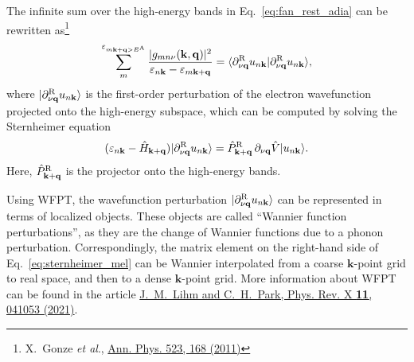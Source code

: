 \documentclass[a4paper,11pt,serif]{article}
\newcommand{\Eq}[1]{{Eq.~\eqref{#1}}}
\newcommand{\mb}[1]{\mathbf{#1}}
\begin{document}
The infinite sum over the high-energy bands in Eq.~\eqref{eq:fan_rest_adia} can be rewritten as\footnote{X.\ Gonze \textit{et al}., \href{https://onlinelibrary.wiley.com/doi/10.1002/andp.201000100}{Ann. Phys. 523, 168 (2011)}}
\begin{equation} \label{eq:sternheimer_mel}
   \sum_{m}^{\varepsilon_{m\mb{k}+\mb{q} > E^{\rm A}}} \frac{| g_{mn\nu}(\mb{k,q})|^2}{\varepsilon_{n\mb{k}} - \varepsilon_{m\mb{k}+\mb{q}}}
   = \langle \partial^{\rm R}_{\nu\mb{q}} u_{n\mb{k}} | \partial^{\rm R}_{\nu\mb{q}} u_{n\mb{k}} \rangle,
\end{equation}
where $| \partial^{\rm R}_{\nu\mb{q}} u_{n\mb{k}} \rangle$ is the first-order perturbation of the electron wavefunction projected onto the high-energy subspace, which can be computed by solving the Sternheimer equation
\begin{equation} \label{eq:sternheimer}
   (\varepsilon_{n\mb{k}} - \hat{H}_{\mb{k}+\mb{q}}) | \partial^{\rm R}_{\nu\mb{q}} u_{n\mb{k}} \rangle
   =  \hat{P}^{\rm R}_{\mb{k+q}} \,  \partial_{\nu\mb{q}} \hat{V} | u_{n\mb{k}} \rangle.
\end{equation}
Here, $\hat{P}^{\rm R}_{\mb{k+q}}$ is the projector onto the high-energy bands.


Using WFPT, the wavefunction perturbation $| \partial^{\rm R}_{\nu\mb{q}} u_{n\mb{k}} \rangle$ can be represented in terms of localized objects.
These objects are called ``Wannier function perturbations'', as they are the change of Wannier functions due to a phonon perturbation.
Correspondingly, the matrix element on the right-hand side of \Eq{eq:sternheimer_mel} can be Wannier interpolated from a coarse $\mb{k}$-point grid to real space, and then to a dense $\mb{k}$-point grid.
More information about WFPT can be found in the article \href{https://journals.aps.org/prx/abstract/10.1103/PhysRevX.11.041053}{J.\ M.\ Lihm and C.\ H.\ Park, Phys. Rev. X \textbf{11}, 041053 (2021)}.
\end{document}
